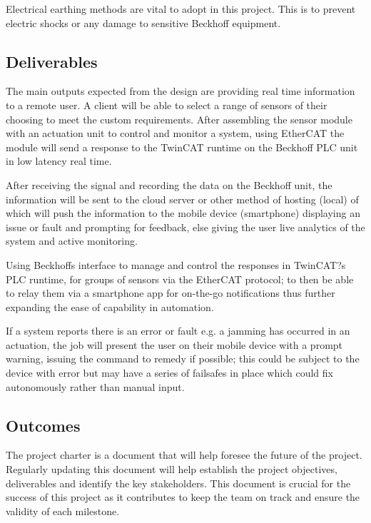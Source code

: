 \documentclass[a4paper, 10pt, conference]{IEEEconf}
\begin{document}
Electrical earthing methods are vital to adopt in this project. This is to prevent electric shocks or any damage to sensitive Beckhoff equipment. 

\subsection{Deliverables}
The main outputs expected from the design are providing real time information to a remote user. A client will be able to select a range of sensors of their choosing to meet the custom requirements. After assembling the sensor module with an actuation unit to control and monitor a system, using EtherCAT the module will send a response to the TwinCAT runtime on the Beckhoff PLC unit in low latency real time. 

After receiving the signal and recording the data on the Beckhoff unit, the information will be sent to the cloud server or other method of hosting (local) of which will push the information to the mobile device (smartphone) displaying an issue or fault and prompting for feedback, else giving the user live analytics of the system and active monitoring.

Using Beckhoffs interface to manage and control the responses in TwinCAT?s PLC runtime, for groups of sensors via the EtherCAT protocol; to then be able to relay them via a smartphone app for on-the-go notifications thus further expanding the ease of capability in automation.

If a system reports there is an error or fault e.g. a jamming has occurred in an actuation, the job will present the user on their mobile device with a prompt warning, issuing the command to remedy if possible; this could be subject to the device with error but may have a series of failsafes in place which could fix autonomously rather than manual input.

\subsection{Outcomes}


The project charter is a document that will help foresee the future of the project. Regularly updating this document will help establish the project objectives, deliverables and identify the key stakeholders. This document is crucial for the success of this project as it contributes to keep the team on track and ensure the validity of each milestone. 
\end{document}
